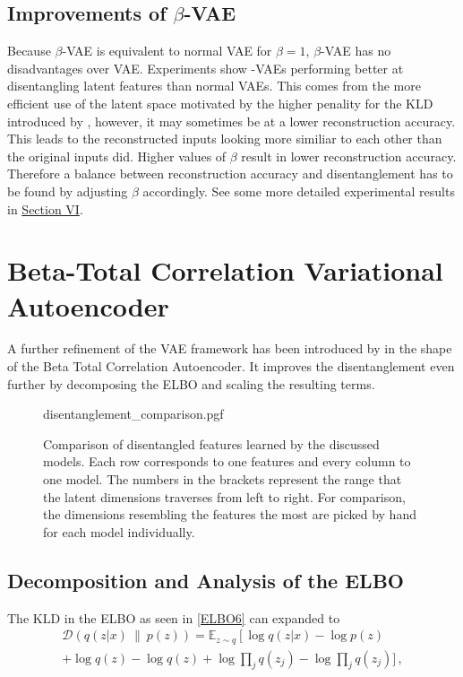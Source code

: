 \documentclass[a4paper]{IEEEtran}
\begin{document}
{\subsection{Improvements of $\beta$-VAE}
Because $\beta$-VAE is equivalent to normal VAE for $\beta = 1$, $\beta$-VAE has no disadvantages over VAE. Experiments show \textbeta -VAEs performing better at disentangling latent features than normal VAEs. This comes from the more efficient use of the latent space motivated by the higher penality for the KLD introduced by \textbeta, however, it may sometimes be at a lower reconstruction accuracy. This leads to the reconstructed inputs looking more similiar to each other than the original inputs did. Higher values of $\beta$ result in lower reconstruction accuracy. Therefore a balance between reconstruction accuracy and disentanglement has to be found by adjusting $\beta$ accordingly. See some more detailed experimental results in \hyperref[sec:experiments]{Section VI}.


\section{Beta-Total Correlation Variational Autoencoder}
A further refinement of the VAE framework has been introduced by \cite{chen2019isolating} in the shape of the Beta Total Correlation Autoencoder. It improves the disentanglement even further by decomposing the ELBO and scaling the resulting terms.

\begin{figure*}[h]
	\centering
    {disentanglement_comparison.pgf}
    \caption{Comparison of disentangled features learned by the discussed models. Each row corresponds to one features and every column to one model. The numbers in the brackets represent the range that the latent dimensions traverses from left to right. For comparison, the dimensions resembling the features the most are picked by hand for each model individually.}
    \label{fig:disentanglement}
\end{figure*}

\subsection{Decomposition and Analysis of the ELBO}
The KLD in the ELBO as seen in \eqref{ELBO6} can expanded to
\begin{align*}
\mathcal{D}(q(z|x) \ \| \ p(z)) =
	\mathbb{E}_{z \sim q} \left[ \log q(z|x) - \log p(z) \right. \\
	 + \log q(z) - \log q(z) + \log \prod_j q(z_j) - \log \prod_j q(z_j) ]\,,
\end{align*}

}
\end{document}
